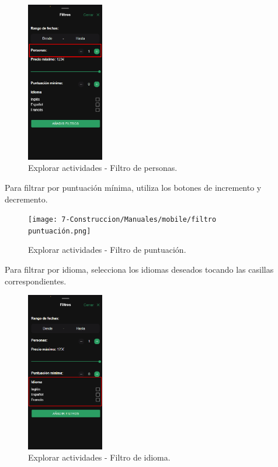 \begin{figure}[H]
	\centering
	\includegraphics[width=0.3\textwidth]{7-Construccion/Manuales/mobile/filtro personas.png}
	\caption{Explorar actividades - Filtro de personas.}
\end{figure}
Para filtrar por puntuación mínima, utiliza los botones de incremento y decremento.
\begin{figure}[H]
	\centering
	\texttt{[image: 7-Construccion/Manuales/mobile/filtro puntuación.png]}
	\caption{Explorar actividades - Filtro de puntuación.}
\end{figure}
Para filtrar por idioma, selecciona los idiomas deseados tocando las casillas correspondientes.
\begin{figure}[H]
	\centering
	\includegraphics[width=0.3\textwidth]{7-Construccion/Manuales/mobile/filtro idioma.png}
	\caption{Explorar actividades - Filtro de idioma.}
\end{figure}

